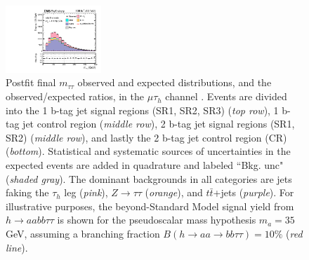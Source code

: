 \begin{figure}[ht]
\begin{center}
        \includegraphics[width=0.32\textwidth]{figures/ch-10-results/mt_all_7_post_prelim-yes.pdf}
    \end{center}
    \caption[Postfit final observed and expected $m_{\tau\tau}$ distributions in the $\mu\tau_{h}$ channel, for the 1 b-tag jet and 2 b-tag jet signal and control regions.]{Postfit final $m_{\tau\tau}$ observed and expected distributions, and the observed/expected ratios, in the $\mu\tau_{h}$ channel \cite{CMS-AN-20-213}. Events are divided into the 1 b-tag jet signal regions (SR1, SR2, SR3) (\textit{top row}), 1 b-tag jet control region (\textit{middle row}), 2 b-tag jet signal regions (SR1, SR2) (\textit{middle row}), and lastly the 2 b-tag jet control region (CR) (\textit{bottom}). Statistical and systematic sources of uncertainties in the expected events are added in quadrature and labeled ``Bkg. unc" (\textit{shaded gray}). The dominant backgrounds in all categories are jets faking the $\tau_{h}$ leg (\textit{pink}), $Z \rightarrow \tau\tau$ (\textit{orange}), and $t\bar{t}$+jets (\textit{purple}). For illustrative purposes, the beyond-Standard Model signal yield from $h\rightarrow aa bb\tau\tau$ is shown for the pseudoscalar mass hypothesis $m_a = 35$ GeV, assuming a branching fraction $B(h \rightarrow aa \rightarrow bb\tau\tau) = 10\%$ (\textit{red line}).}
    \label{fig:results_mtt_postfit_mtall}
\end{figure}

